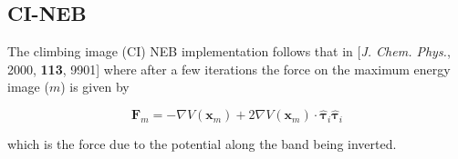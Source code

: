 \documentclass[10pt]{article}
\begin{document}
\subsection{CI-NEB}

The climbing image (CI) NEB implementation follows that in [\emph{J. Chem. Phys.}, 2000, {\bfseries{113}}, 9901] where after a few iterations the force on the maximum energy image ($m$) is given by

\begin{equation}
\boldsymbol{F}_{m} = -\nabla V(\boldsymbol{x}_m) + 2\nabla V(\boldsymbol{x}_m)\cdot \hat{\boldsymbol{\tau}}_i\hat{\boldsymbol{\tau}}_i
\end{equation}

which is the force due to the potential along the band being inverted.
\end{document}

